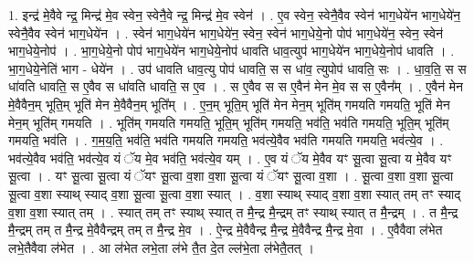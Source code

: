 \documentclass[17pt]{extarticle}
\begin{document}
1. इन्द्र॑ मे॒वैवे न्द्र॒ मिन्द्र॑ मे॒व स्वेन॒ स्वेनै॒वे न्द्र॒ मिन्द्र॑ मे॒व स्वेन॑ । . ए॒व स्वेन॒ स्वेनै॒वैव स्वेन॑ भाग॒धेये॑न भाग॒धेये॑न॒ स्वेनै॒वैव स्वेन॑ भाग॒धेये॑न । . स्वेन॑ भाग॒धेये॑न भाग॒धेये॑न॒ स्वेन॒ स्वेन॑ भाग॒धेये॒नो पोप॑ भाग॒धेये॑न॒ स्वेन॒ स्वेन॑ भाग॒धेये॒नोप॑ । . भा॒ग॒धेये॒नो पोप॑ भाग॒धेये॑न भाग॒धेये॒नोप॑ धावति धाव॒त्युप॑ भाग॒धेये॑न भाग॒धेये॒नोप॑ धावति । . भा॒ग॒धेये॒नेति॑ भाग - धेये॑न । . उप॑ धावति धाव॒त्यु पोप॑ धावति॒ स स धा॑व॒ त्युपोप॑ धावति॒ सः । . धा॒व॒ति॒ स स धा॑वति धावति॒ स ए॒वैव स धा॑वति धावति॒ स ए॒व । . स ए॒वैव स स ए॒वैन॑ मेन मे॒व स स ए॒वैन᳚म् । . ए॒वैन॑ मेन मे॒वैवैन॒म् भूति॒म् भूति॑ मेन मे॒वैवैन॒म् भूति᳚म् । . ए॒न॒म् भूति॒म् भूति॑ मेन मेन॒म् भूति॑म् गमयति गमयति॒ भूति॑ मेन मेन॒म् भूति॑म् गमयति । . भूति॑म् गमयति गमयति॒ भूति॒म् भूति॑म् गमयति॒ भव॑ति॒ भव॑ति गमयति॒ भूति॒म् भूति॑म् गमयति॒ भव॑ति । . ग॒म॒य॒ति॒ भव॑ति॒ भव॑ति गमयति गमयति॒ भव॑त्ये॒वैव भव॑ति गमयति गमयति॒ भव॑त्ये॒व । . भव॑त्ये॒वैव भव॑ति॒ भव॑त्ये॒व यं ॅय मे॒व भव॑ति॒ भव॑त्ये॒व यम् । . ए॒व यं ॅय मे॒वैव यꣳ सू॒त्वा सू॒त्वा य मे॒वैव यꣳ सू॒त्वा । . यꣳ सू॒त्वा सू॒त्वा यं ॅयꣳ सू॒त्वा व॒शा व॒शा सू॒त्वा यं ॅयꣳ सू॒त्वा व॒शा । . सू॒त्वा व॒शा व॒शा सू॒त्वा सू॒त्वा व॒शा स्याथ् स्याद् व॒शा सू॒त्वा सू॒त्वा व॒शा स्यात् । . व॒शा स्याथ् स्याद् व॒शा व॒शा स्यात् तम् तꣳ स्याद् व॒शा व॒शा स्यात् तम् । . स्यात् तम् तꣳ स्याथ् स्यात् त मै॒न्द्र मै॒न्द्रम् तꣳ स्याथ् स्यात् त मै॒न्द्रम् । . त मै॒न्द्र मै॒न्द्रम् तम् त मै॒न्द्र मे॒वैवैन्द्रम् तम् त मै॒न्द्र मे॒व । . ऐ॒न्द्र मे॒वैवैन्द्र मै॒न्द्र मे॒वैवैन्द्र मै॒न्द्र मे॒वा । . ए॒वैवैवा ल॑भेत लभे॒तैवैवा ल॑भेत । . आ ल॑भेत लभे॒ता ल॑भे तै॒त दे॒त ल्ल॑भे॒ता ल॑भेतै॒तत् । \newline
\end{document}
